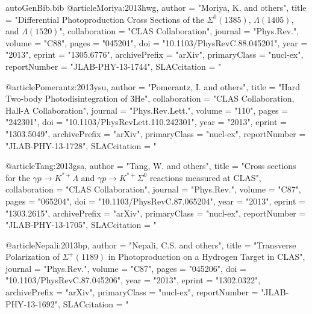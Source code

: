 \begin{filecontents*}{autoGenBib.bib}
@article{Moriya:2013hwg,
      author         = "Moriya, K. and others",
      title          = "{Differential Photoproduction Cross Sections of the
                        $\Sigma^0(1385)$, $\Lambda(1405)$, and $\Lambda(1520)$}",
      collaboration  = "CLAS Collaboration",
      journal        = "Phys.Rev.",
      volume         = "C88",
      pages          = "045201",
      doi            = "10.1103/PhysRevC.88.045201",
      year           = "2013",
      eprint         = "1305.6776",
      archivePrefix  = "arXiv",
      primaryClass   = "nucl-ex",
      reportNumber   = "JLAB-PHY-13-1744",
      SLACcitation   = "%
}

@article{Pomerantz:2013ysu,
      author         = "Pomerantz, I. and others",
      title          = "{Hard Two-body Photodisintegration of 3He}",
      collaboration  = "CLAS Collaboration, Hall-A Collaboration",
      journal        = "Phys.Rev.Lett.",
      volume         = "110",
      pages          = "242301",
      doi            = "10.1103/PhysRevLett.110.242301",
      year           = "2013",
      eprint         = "1303.5049",
      archivePrefix  = "arXiv",
      primaryClass   = "nucl-ex",
      reportNumber   = "JLAB-PHY-13-1728",
      SLACcitation   = "%
}

@article{Tang:2013gsa,
      author         = "Tang, W. and others",
      title          = "{Cross sections for the $\gamma p \to K^{*+} \Lambda$ and
                        $\gamma p \to K^{*+} \Sigma^{0}$ reactions measured at
                        CLAS}",
      collaboration  = "CLAS Collaboration",
      journal        = "Phys.Rev.",
      volume         = "C87",
      pages          = "065204",
      doi            = "10.1103/PhysRevC.87.065204",
      year           = "2013",
      eprint         = "1303.2615",
      archivePrefix  = "arXiv",
      primaryClass   = "nucl-ex",
      reportNumber   = "JLAB-PHY-13-1705",
      SLACcitation   = "%
}

@article{Nepali:2013bp,
      author         = "Nepali, C.S. and others",
      title          = "{Transverse Polarization of $\Sigma^{+}(1189)$ in
                        Photoproduction on a Hydrogen Target in CLAS}",
      journal        = "Phys.Rev.",
      volume         = "C87",
      pages          = "045206",
      doi            = "10.1103/PhysRevC.87.045206",
      year           = "2013",
      eprint         = "1302.0322",
      archivePrefix  = "arXiv",
      primaryClass   = "nucl-ex",
      reportNumber   = "JLAB-PHY-13-1692",
      SLACcitation   = "%
}


\end{filecontents*}
